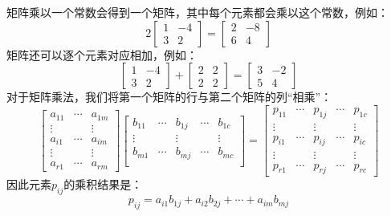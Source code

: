 \documentclass[lang=cn,12pt,marginpar=margintrue]{elegantbook}
\begin{document}
矩阵乘以一个常数会得到一个矩阵，其中每个元素都会乘以这个常数，例如：
\[
  2\left[\begin{array}{rr}
      1 & -4 \\
      3 & 2
    \end{array}\right]=\left[\begin{array}{rr}
      2 & -8 \\
      6 & 4
    \end{array}\right]
\]
矩阵还可以逐个元素对应相加，例如：
\[
  \left[\begin{array}{rr}
      1 & -4 \\
      3 & 2
    \end{array}\right]+\left[\begin{array}{ll}
      2 & 2 \\
      2 & 2
    \end{array}\right]=\left[\begin{array}{rr}
      3 & -2 \\
      5 & 4
    \end{array}\right]
\]
对于矩阵乘法，我们将第一个矩阵的行与第二个矩阵的列“相乘”：
\[
  \begin{bmatrix}
    a_{11} & \cdots & a_{1m} \\
    \vdots &        & \vdots \\
    a_{i1} & \cdots & a_{im} \\
    \vdots &        & \vdots \\
    a_{r1} & \cdots & a_{rm}
  \end{bmatrix}
  \begin{bmatrix}
    b_{11} & \cdots & b_{1j} & \cdots & b_{1c} \\
    \vdots &        & \vdots &        & \vdots \\
    b_{m1} & \cdots & b_{mj} & \cdots & b_{mc} \\
  \end{bmatrix}
  =
  \begin{bmatrix}
    p_{11} & \cdots & p_{1j} & \cdots & p_{1c} \\
    \vdots &        & \vdots &        & \vdots \\
    p_{i1} & \cdots & p_{ij} & \cdots & p_{ic} \\
    \vdots &        & \vdots &        & \vdots \\
    p_{r1} & \cdots & p_{rj} & \cdots & p_{rc}
  \end{bmatrix}
\]
因此元素$p_{ij}$的乘积结果是：
\begin{equation}
  p_{ij} = a_{i1}b_{1j} + a_{i2}b_{2j}+ \cdots + a_{im}b_{mj}
\end{equation}
\end{document}
